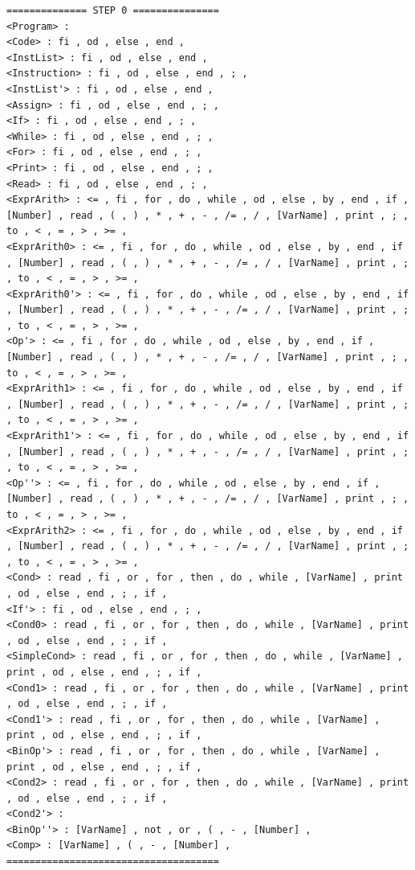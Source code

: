 \documentclass[pdftex,10pt,a4paper]{article}
\begin{document}
\begin{lstlisting}[breaklines]
============== STEP 0 ===============
<Program> : 
<Code> : fi , od , else , end , 
<InstList> : fi , od , else , end , 
<Instruction> : fi , od , else , end , ; , 
<InstList'> : fi , od , else , end , 
<Assign> : fi , od , else , end , ; , 
<If> : fi , od , else , end , ; , 
<While> : fi , od , else , end , ; , 
<For> : fi , od , else , end , ; , 
<Print> : fi , od , else , end , ; , 
<Read> : fi , od , else , end , ; , 
<ExprArith> : <= , fi , for , do , while , od , else , by , end , if , [Number] , read , ( , ) , * , + , - , /= , / , [VarName] , print , ; , to , < , = , > , >= , 
<ExprArith0> : <= , fi , for , do , while , od , else , by , end , if , [Number] , read , ( , ) , * , + , - , /= , / , [VarName] , print , ; , to , < , = , > , >= , 
<ExprArith0'> : <= , fi , for , do , while , od , else , by , end , if , [Number] , read , ( , ) , * , + , - , /= , / , [VarName] , print , ; , to , < , = , > , >= , 
<Op'> : <= , fi , for , do , while , od , else , by , end , if , [Number] , read , ( , ) , * , + , - , /= , / , [VarName] , print , ; , to , < , = , > , >= , 
<ExprArith1> : <= , fi , for , do , while , od , else , by , end , if , [Number] , read , ( , ) , * , + , - , /= , / , [VarName] , print , ; , to , < , = , > , >= , 
<ExprArith1'> : <= , fi , for , do , while , od , else , by , end , if , [Number] , read , ( , ) , * , + , - , /= , / , [VarName] , print , ; , to , < , = , > , >= , 
<Op''> : <= , fi , for , do , while , od , else , by , end , if , [Number] , read , ( , ) , * , + , - , /= , / , [VarName] , print , ; , to , < , = , > , >= , 
<ExprArith2> : <= , fi , for , do , while , od , else , by , end , if , [Number] , read , ( , ) , * , + , - , /= , / , [VarName] , print , ; , to , < , = , > , >= , 
<Cond> : read , fi , or , for , then , do , while , [VarName] , print , od , else , end , ; , if , 
<If'> : fi , od , else , end , ; , 
<Cond0> : read , fi , or , for , then , do , while , [VarName] , print , od , else , end , ; , if , 
<SimpleCond> : read , fi , or , for , then , do , while , [VarName] , print , od , else , end , ; , if , 
<Cond1> : read , fi , or , for , then , do , while , [VarName] , print , od , else , end , ; , if , 
<Cond1'> : read , fi , or , for , then , do , while , [VarName] , print , od , else , end , ; , if , 
<BinOp'> : read , fi , or , for , then , do , while , [VarName] , print , od , else , end , ; , if , 
<Cond2> : read , fi , or , for , then , do , while , [VarName] , print , od , else , end , ; , if , 
<Cond2'> : 
<BinOp''> : [VarName] , not , or , ( , - , [Number] , 
<Comp> : [VarName] , ( , - , [Number] , 
=====================================


\end{lstlisting}
\end{document}
